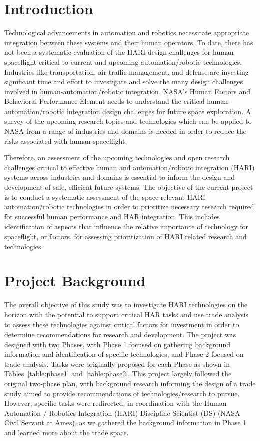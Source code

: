 \section{Introduction}
Technological advancements in automation and robotics necessitate appropriate integration between these systems and their human operators.
To date, there has not been a systematic evaluation of the HARI design challenges for human spaceflight critical to current and upcoming automation/robotic technologies.
Industries like transportation, air traffic management, and defense are investing significant time and effort to investigate and solve the many design challenges involved in human-automation/robotic integration.
NASA's Human Factors and Behavioral Performance Element needs to understand the critical human-automation/robotic integration design challenges for future space exploration.
A survey of the upcoming research topics and technologies which can be applied to NASA from a range of industries and domains is needed in order to reduce the risks associated with human spaceflight.

Therefore, an assessment of the upcoming technologies and open research challenges critical to effective human and automation/robotic integration (HARI) systems across industries and domains is essential to inform the design and development of safe, efficient future systems.
The objective of the current project is to conduct a systematic assessment of the space-relevant HARI automation/robotic technologies in order to prioritize necessary research required for successful human performance and HAR integration.
This includes identification of aspects that influence the relative importance of technology for spaceflight, or factors, for assessing prioritization of HARI related research and technologies.

\section{Project Background}
The overall objective of this study was to investigate HARI technologies on the horizon with the potential to support critical HAR tasks and use trade analysis to assess these technologies against critical factors for investment in order to determine recommendations for research and development.
The project was designed with two Phases, with Phase 1 focused on gathering background information and identification of specific technologies, and Phase 2 focused on trade analysis.
Tasks were originally proposed for each Phase as shown in Tables~\ref{table:phase1} and~\ref{table:phase2}.
This project largely followed the original two-phase plan, with background research informing the design of a trade study aimed to provide recommendations of technologies/research to pursue.
However, specific tasks were redirected, in coordination with the Human Automation / Robotics Integration (HARI) Discipline Scientist (DS) (NASA Civil Servant at Ames), as we gathered the background information in Phase 1 and learned more about the trade space.

